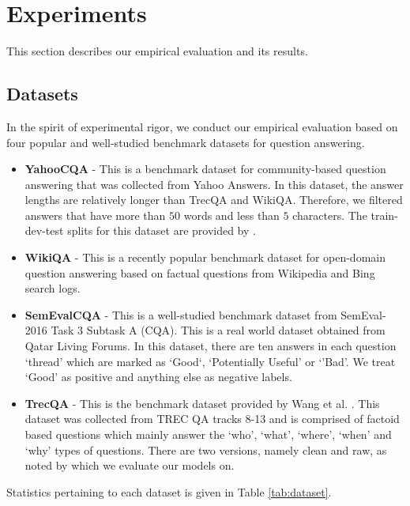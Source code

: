 \documentclass[sigconf]{acmart}
\begin{document}
\section{Experiments}
This section describes our empirical evaluation and its results. 
\subsection{Datasets}
In the spirit of experimental rigor, we conduct our empirical evaluation based on four popular and well-studied benchmark datasets for question answering. 

\begin{itemize}
	\item \textbf{YahooCQA} -  This is a benchmark dataset for community-based question answering that was collected from Yahoo Answers. In this dataset, the answer lengths are relatively longer than TrecQA and WikiQA. Therefore, we filtered answers that have more than $50$ words and less than $5$ characters. The train-dev-test splits for this dataset are provided by \cite{DBLP:conf/sigir/TayPLH17}.

	\item \textbf{WikiQA} - This is a recently popular benchmark dataset \cite{DBLP:conf/emnlp/YangYM15} for open-domain question answering based on factual questions from Wikipedia and Bing search logs.
	\item \textbf{SemEvalCQA} - This is a well-studied benchmark dataset from SemEval-2016 Task 3 Subtask A (CQA). This is a real world dataset obtained from Qatar Living Forums. In this dataset, there are ten answers in each question `thread' which are marked as `Good`, `Potentially Useful' or `'Bad'. We treat `Good' as positive and anything else as negative labels. 
\item \textbf{TrecQA} - This is the benchmark dataset provided by Wang et al. \cite{DBLP:conf/emnlp/WangSM07}. This dataset was collected from TREC QA tracks 8-13 and is comprised of factoid based questions which mainly answer the `who', `what', `where', `when' and `why' types of questions. There are two versions, namely clean and raw, as noted by \cite{DBLP:conf/cikm/RaoHL16} which we evaluate our models on. 

\end{itemize}
Statistics pertaining to each dataset is given in Table \ref{tab:dataset}. 
\end{document}
